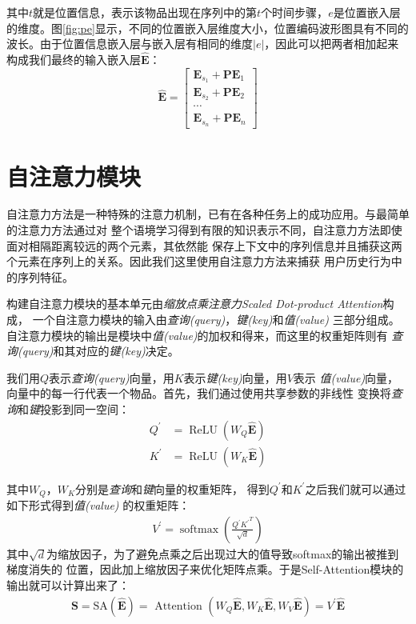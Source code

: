 其中$t$就是位置信息，表示该物品出现在序列中的第$t$个时间步骤，$e$是位置嵌入层的维度。图\ref{fig:pe}显示，不同的位置嵌入层维度大小，位置编码波形图具有不同的波长。由于位置信息嵌入层与嵌入层有相同的维度$|e|$，因此可以把两者相加起来构成我们最终的输入嵌入层$\widehat{\mathbf{E}}$：
\begin{equation}
	\label{equ:chap04:embedding}
	\widehat{\mathbf{E}}=\left[ \begin{array}{c}{\mathbf{E}_{s_{1}}+\mathbf{PE}_{1}} \\ 
	{\mathbf{E}_{s_{2}}+\mathbf{PE}_{2}} \\ 
	\cdots \\
	{\mathbf{E}_{s_{n}}+\mathbf{PE}_{n}}\end{array}\right]
\end{equation}


\section{自注意力模块}

自注意力方法是一种特殊的注意力机制，已有在各种任务上的成功应用。与最简单的注意力方法通过对%
整个语境学习得到有限的知识表示不同，自注意力方法即使面对相隔距离较远的两个元素，其依然能%
保存上下文中的序列信息并且捕获这两个元素在序列上的关系。因此我们这里使用自注意力方法来捕获%
用户历史行为中的序列特征。

构建自注意力模块的基本单元由\textit{缩放点乘注意力Scaled Dot-product Attention}构成，%
一个自注意力模块的输入由\textit{查询(query)}，\textit{键(key)}和\textit{值(value)}%
三部分组成。自注意力模块的输出是模块中\textit{值(value)}的加权和得来，而这里的权重矩阵则有%
\textit{查询(query)}和其对应的\textit{键(key)}决定。

我们用$Q$表示\textit{查询(query)}向量，用$K$表示\textit{键(key)}向量，用$V$表示%
\textit{值(value)}向量，向量中的每一行代表一个物品。首先，我们通过使用共享参数的非线性%
变换将\textit{查询}和\textit{键}投影到同一空间：
\begin{align} 
	Q^{\prime} &=\operatorname{ReLU}(W_{Q}\widehat{\mathbf{E}}) \\ 
	K^{\prime} &=\operatorname{ReLU}(W_{K}\widehat{\mathbf{E}})
\end{align}

其中$W_{Q}$，$W_{K}$分别是\textit{查询}和\textit{键}向量的权重矩阵，%
得到$Q^{\prime}$和$K^{\prime}$之后我们就可以通过如下形式得到\textit{值(value)}%
的权重矩阵：
\begin{align} 
	V^{\prime}=\operatorname{softmax}(\frac{Q^{\prime} {K^{\prime}}^{T}}{\sqrt{d}})
\end{align}
其中$\sqrt{d}$为缩放因子，为了避免点乘之后出现过大的值导致softmax的输出被推到梯度消失的%
位置，因此加上缩放因子来优化矩阵点乘。于是Self-Attention模块的输出就可以计算出来了：
\begin{align} 
	\mathbf{S}=\mathrm{SA}(\widehat{\mathbf{E}})=\text { Attention }(W_{Q}\widehat{\mathbf{E}}, W_{K}\widehat{\mathbf{E}}, W_{V}\widehat{\mathbf{E}}) = V^{\prime}\widehat{\mathbf{E}}
\end{align}


